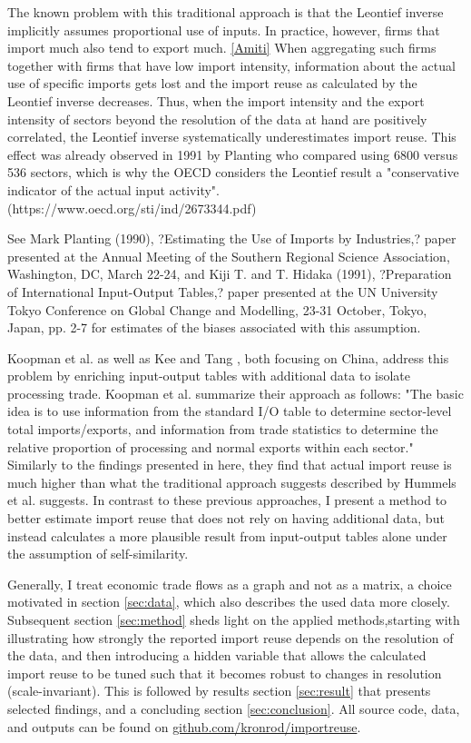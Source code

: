 \documentclass{paper}
\begin{document}
The known problem with this traditional approach is that the Leontief inverse implicitly assumes proportional use of inputs. In practice, however, firms that import much also tend to export much. \ref{Amiti} When aggregating such firms together with firms that have low import intensity, information about the actual use of specific imports gets lost and the import reuse as calculated by the Leontief inverse decreases. Thus, when the import intensity and the export intensity of sectors beyond the resolution of the data at hand are positively correlated, the Leontief inverse systematically underestimates import reuse. This effect was already observed in 1991 by Planting who compared using 6800 versus 536 sectors, which is why the OECD considers the Leontief result a "conservative indicator of the actual input activity". (https://www.oecd.org/sti/ind/2673344.pdf)

 See Mark Planting (1990), ?Estimating the Use of Imports by Industries,? paper presented at the Annual Meeting of the Southern Regional Science Association, Washington, DC, March 22-24, and Kiji T. and T. Hidaka (1991), ?Preparation of International
Input-Output Tables,? paper presented at the UN University Tokyo Conference on Global Change and Modelling, 23-31 October,
Tokyo, Japan, pp. 2-7 for estimates of the biases associated with this assumption.

Koopman et al. \cite{koopman2012tracing} as well as Kee and Tang \cite{kee2013domestic}, both focusing on China, address this problem by enriching input-output tables with additional data to isolate processing trade. Koopman et al. summarize their approach as follows: "The basic idea is to use information from the standard I/O table to determine sector-level total imports/exports, and information from trade statistics to determine the relative proportion of processing and normal exports within each sector." Similarly to the findings presented in here, they find that actual import reuse is much higher than what the traditional approach suggests described by Hummels et al. \cite{hummels2001nature} suggests. In contrast to these previous approaches, I present a method to better estimate import reuse that does not rely on having additional data, but instead calculates a more plausible result from input-output tables alone under the assumption of self-similarity.

Generally, I treat economic trade flows as a graph and not as a matrix, a choice motivated in section \ref{sec:data}, which also describes the used data more closely. Subsequent section \ref{sec:method} sheds light on the applied methods,starting with illustrating how strongly the reported import reuse depends on the resolution of the data, and then introducing a hidden variable that allows the calculated import reuse to be tuned such that it becomes robust to changes in resolution (scale-invariant). This is followed by results section \ref{sec:result} that presents selected findings, and a concluding section \ref{sec:conclusion}. All source code, data, and outputs can be found on \href{https://github.com/kronrod/importreuse}{github.com/kronrod/importreuse}.
\end{document}

